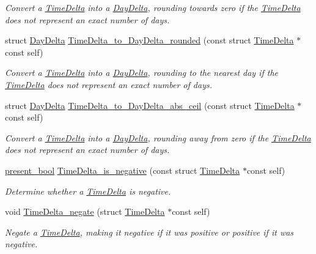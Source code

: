 \begin{DoxyCompactItemize}
\begin{DoxyCompactList}\small\item\em \-Convert a \hyperlink{structTimeDelta}{\-Time\-Delta} into a \hyperlink{structDayDelta}{\-Day\-Delta}, rounding towards zero if the \hyperlink{structTimeDelta}{\-Time\-Delta} does not represent an exact number of days. \end{DoxyCompactList}\item 
struct \hyperlink{structDayDelta}{\-Day\-Delta} \hyperlink{time-delta_8h_a7bbf766c60002c0835d0a81dfdfa7918}{\-Time\-Delta\-\_\-to\-\_\-\-Day\-Delta\-\_\-rounded} (const struct \hyperlink{structTimeDelta}{\-Time\-Delta} $\ast$const self)
\begin{DoxyCompactList}\small\item\em \-Convert a \hyperlink{structTimeDelta}{\-Time\-Delta} into a \hyperlink{structDayDelta}{\-Day\-Delta}, rounding to the nearest day if the \hyperlink{structTimeDelta}{\-Time\-Delta} does not represent an exact number of days. \end{DoxyCompactList}\item 
struct \hyperlink{structDayDelta}{\-Day\-Delta} \hyperlink{time-delta_8h_ae1a3f58fc84a366415dc6cde308b27ee}{\-Time\-Delta\-\_\-to\-\_\-\-Day\-Delta\-\_\-abs\-\_\-ceil} (const struct \hyperlink{structTimeDelta}{\-Time\-Delta} $\ast$const self)
\begin{DoxyCompactList}\small\item\em \-Convert a \hyperlink{structTimeDelta}{\-Time\-Delta} into a \hyperlink{structDayDelta}{\-Day\-Delta}, rounding away from zero if the \hyperlink{structTimeDelta}{\-Time\-Delta} does not represent an exact number of days. \end{DoxyCompactList}\item 
\hyperlink{types_8h_a1c24e2cdd988b886e889080ded176ae0}{present\-\_\-bool} \hyperlink{time-delta_8h_a4fc42a10abf8771117d2f9ced4f11bf2}{\-Time\-Delta\-\_\-is\-\_\-negative} (const struct \hyperlink{structTimeDelta}{\-Time\-Delta} $\ast$const self)
\begin{DoxyCompactList}\small\item\em \-Determine whether a \hyperlink{structTimeDelta}{\-Time\-Delta} is negative. \end{DoxyCompactList}\item 
void \hyperlink{time-delta_8h_a906aa66074e2d9ef675ea2d2a1d25084}{\-Time\-Delta\-\_\-negate} (struct \hyperlink{structTimeDelta}{\-Time\-Delta} $\ast$const self)
\begin{DoxyCompactList}\small\item\em \-Negate a \hyperlink{structTimeDelta}{\-Time\-Delta}, making it negative if it was positive or positive if it was negative. \end{DoxyCompactList}\item 

\end{DoxyCompactItemize}
